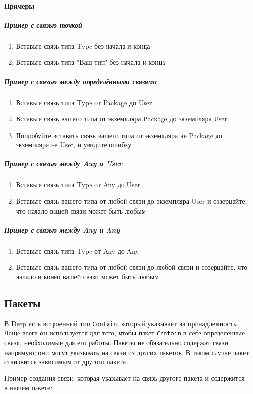 \documentclass{article}
\begin{document}
\paragraph{Примеры}
\subparagraph{Пример с связью точкой}
\begin{enumerate}
  \item Вставьте связь типа Type без начала и конца
  \item Вставьте связь типа "Ваш тип" без начала и конца
\end{enumerate}
\subparagraph{Пример с связью между определёнными связями}
\begin{enumerate}
  \item Вставьте связь типа Type от Package до User
  \item Вставьте связь вашего типа от экземпляра Package до экземпляра User
  \item Попробуйте вставить связь вашего типа от экземпляра не Package до
        экземпляра не User, и увидите ошибку
\end{enumerate}
\subparagraph{Пример с связью между Any и User}
\begin{enumerate}
  \item Вставьте связь типа Type от Any до User
  \item Вставьте связь вашего типа от любой связи до экземпляра User и
        созерцайте, что начало вашей связи может быть любым
\end{enumerate}
\subparagraph{Пример с связью между Any и Any}
\begin{enumerate}
  \item Вставьте связь типа Type от Any до Any
  \item Вставьте связь вашего типа от любой связи до любой связи и
        созерцайте, что начало и конец вашей связи может быть любым
\end{enumerate}
\subsection{Пакеты}

В Deep есть встроенный тип \texttt{Contain}, который указывает на
принадлежность. Чаще всего он используется для того, чтобы пакет
\texttt{Contain} в себе определенные связи, необходимые для его работы.
Пакеты не обязательно содержат связи напрямую; они могут
                указывать на связи из других пакетов. В таком случае пакет становится зависимым от другого пакета


Пример создания связи, которая указывает на связь другого пакета и содержится в нашем пакете:
\end{document}
